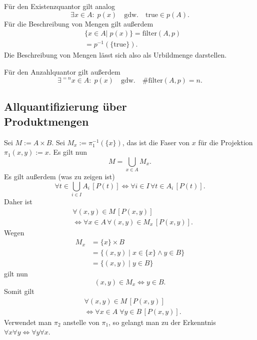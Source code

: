 \documentclass[a4paper,10pt,fleqn,twocolumn,twoside]{article}
\numberwithin{equation}{section}
\begin{document}
Für den Existenzquantor gilt analog
\begin{equation}
\exists x{\in}A{:}\;p(x)\quad\text{gdw.}\quad\mathrm{true}\in p(A).
\end{equation}
Für die Beschreibung von Mengen gilt
außerdem
\begin{equation}
\begin{split}
&\{x{\in}A|\;p(x)\} = \mathrm{filter}(A,p)\\
&= p^{-1}(\{\mathrm{true}\}).
\end{split}
\end{equation}
Die Beschreibung von Mengen lässt sich also als
Urbildmenge darstellen.

Für den Anzahlquantor gilt außerdem
\begin{equation}
\exists^{=n} x{\in}A{:}\; p(x)
\quad\text{gdw.}\quad \#\mathrm{filter}(A,p)=n.
\end{equation}

\subsection[Allquantifizierung über Produktmengen]%
{Allquantifizierung über\\Produktmengen}
Sei $M:=A\times B$. Sei $M_x:=\pi_1^{-1}(\{x\})$, das ist die
Faser von $x$ für die Projektion $\pi_1(x,y):=x$. Es gilt nun
\begin{equation}
M=\bigcup_{x\in A} M_x.
\end{equation}
Es gilt außerdem (was zu zeigen ist)
\begin{equation}\label{eq:forall-union}
\forall t{\in}\bigcup_{i\in I} A_i\,[P(t)]
\iff\forall i{\in}I\,\forall t{\in}A_i\,[P(t)].
\end{equation}
Daher ist
\begin{equation}
\begin{split}
&\forall (x,y){\in}M\,[P(x,y)]\\
&\iff\forall x{\in}A\,\forall (x,y){\in}M_x\,[P(x,y)].
\end{split}
\end{equation}
Wegen
\begin{equation}
\begin{split}
M_x &= \{x\}\times B\\
&= \{(x,y)\mid x\in\{x\}\land y\in B\}\\
&= \{(x,y)\mid y\in B\}
\end{split}
\end{equation}
gilt nun
\begin{equation}
(x,y)\in M_x\iff y\in B.
\end{equation}
Somit gilt
\begin{equation}
\begin{split}
&\forall (x,y){\in}M\,[P(x,y)]\\
&\iff\forall x{\in}A\;\forall y{\in}B\,[P(x,y)].
\end{split}
\end{equation}
Verwendet man $\pi_2$ anstelle von $\pi_1$, so gelangt man
zu der Erkenntnis $\forall x\forall y\iff\forall y\forall x$.
\end{document}
